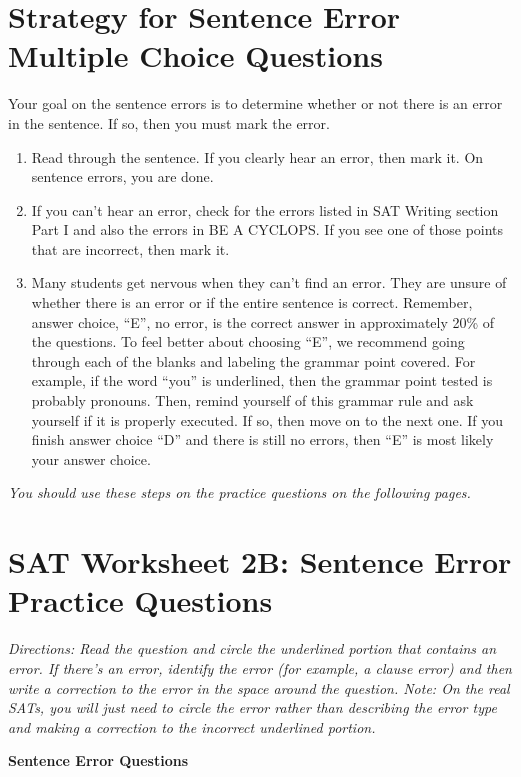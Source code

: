 \documentclass[12pt]{book}
\begin{document}
\newpage
\section[Sentence Error]{Strategy for Sentence Error Multiple Choice Questions}

Your goal on the sentence errors is to determine whether or not there is an error in the sentence. If so, then you must mark the error.

\begin{enumerate}
\item{Read through the sentence. If you clearly hear an error, then mark it. On sentence errors, you are done.}
\vfill\item{If you can't hear an error, check for the errors listed in SAT Writing section Part I and also the errors in BE A CYCLOPS. If you see one of those points that are incorrect, then mark it.} 
\vfill\item{Many students get nervous when they can't find an error. They are unsure of whether there is an error or if the entire sentence is correct. Remember, answer choice, “E”, no error, is the correct answer in approximately 20\% of the questions. To feel better about choosing “E”, we recommend going through each of the blanks and labeling the grammar point covered. For example, if the word “you” is underlined, then the grammar point tested is probably pronouns. Then, remind yourself of this grammar rule and ask yourself if it is properly executed. If so, then move on to the next one. If you finish answer choice “D” and there is still no errors, then “E” is most likely your answer choice.}
\end{enumerate}

\vfill\textit{You should use these steps on the practice questions on the following pages.}
\newpage

\section[Sentence Error Practice]{SAT Worksheet 2B: Sentence Error Practice Questions}
\textit{Directions: Read the question and circle the underlined portion that contains an error. If there's an error, identify the error (for example, a clause error) and then write a correction to the error in the space around the question. Note: On the real SATs, you will just need to circle the error rather than describing the error type and making a correction to the incorrect underlined portion.}

\bigskip
\centerline{\textbf{Sentence Error Questions}}
\end{document}

